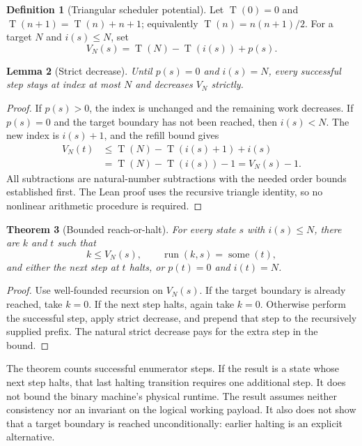 \documentclass[11pt,letterpaper]{article}
\newtheorem{theorem}{Theorem}[section]
\newtheorem{lemma}[theorem]{Lemma}
\theoremstyle{definition}
\newtheorem{definition}[theorem]{Definition}
\theoremstyle{remark}
\newcommand{\Some}{\operatorname{some}}
\newcommand{\tri}{\operatorname{T}}
\begin{document}
\begin{definition}[Triangular scheduler potential]
Let $\tri(0)=0$ and $\tri(n+1)=\tri(n)+n+1$; equivalently
$\tri(n)=n(n+1)/2$. For a target $N$ and $i(s)\le N$, set
\[
 V_N(s)=\tri(N)-\tri(i(s))+p(s).
\]
\end{definition}

\begin{lemma}[Strict decrease]
Until $p(s)=0$ and $i(s)=N$, every successful step stays at index at most
$N$ and decreases $V_N$ strictly.
\end{lemma}

\begin{proof}
If $p(s)>0$, the index is unchanged and the remaining work decreases.
If $p(s)=0$ and the target boundary has not been reached, then $i(s)<N$.
The new index is $i(s)+1$, and the refill bound gives
\[
\begin{split}
 V_N(t)&\le \tri(N)-\tri(i(s)+1)+i(s)\\
       &=\tri(N)-\tri(i(s))-1=V_N(s)-1.
\end{split}
\]
All subtractions are natural-number subtractions with the needed order
bounds established first. The Lean proof uses the recursive triangle
identity, so no nonlinear arithmetic procedure is required.
\end{proof}

\begin{theorem}[Bounded reach-or-halt]
\label{thm:scheduler}
For every state $s$ with $i(s)\le N$, there are $k$ and $t$ such that
\[
 k\le V_N(s),\qquad \operatorname{run}(k,s)=\Some(t),
\]
and either the next step at $t$ halts, or $p(t)=0$ and $i(t)=N$.
\end{theorem}

\begin{proof}
Use well-founded recursion on $V_N(s)$. If the target boundary is already
reached, take $k=0$. If the next step halts, again take $k=0$. Otherwise
perform the successful step, apply strict decrease, and prepend that step
to the recursively supplied prefix. The natural strict decrease pays for
the extra step in the bound.
\end{proof}

The theorem counts successful enumerator steps. If the result is a state
whose next step halts, that last halting transition requires one additional
step. It does not bound the binary machine's physical runtime. The result
assumes neither consistency nor an invariant on the logical working payload.
It also does not show that a target boundary is reached unconditionally:
earlier halting is an explicit alternative.
\end{document}
